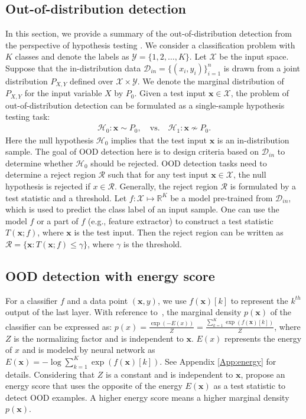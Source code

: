 \documentclass{article}
\newcommand{\benr}{\begin{eqnarray}}
\newcommand{\eenr}{\end{eqnarray}}
\newcommand{\cD}{\mathcal D}
\newcommand{\cH}{\mathcal H}
\newcommand{\cR}{\mathcal R}
\newcommand{\cX}{\mathcal X}
\newcommand{\cY}{\mathcal Y}
\def\rvx{{\mathbf{x}}}
\newcommand{\R}{\mathbb R}
\begin{document}
\subsection{Out-of-distribution detection}\label{testOOD}
In this section, we provide a summary of the out-of-distribution detection from the perspective of hypothesis testing \cite{nalisnick2019detecting,ahmadianlikelihood,haroush2021statistical,zhang2021understanding,bergamin2022model}.
We consider a classification problem with $K$ classes and denote the labels as $\cY = \{1,2,\ldots, K\}$.
Let $\cX$ be the input space. Suppose that the in-distribution data $\cD_{in}=\{(x_i, y_i)\}_{i=1}^n$ is drawn from a joint distribution $P_{X,Y}$ defined over $\cX \times \cY.$
We denote the marginal distribution of $P_{X,Y}$ for the input variable $X$ by $P_0.$ 
Given a test input $\rvx\in\cX$, the problem of out-of-distribution  detection can be formulated as a single-sample hypothesis testing task:
\benr \label{Eq:test}
\cH_0: \rvx \sim P_0, \quad \text{vs.} \quad \cH_1: \rvx \nsim P_0. 
\label{eq1}
\eenr
Here the null hypothesis $\cH_0$ implies that the test input $\rvx$ is an in-distribution sample.
The goal of OOD detection here is to design criteria based on $\cD_{in}$ to determine whether $\cH_0$ should be rejected. OOD detection tasks need to determine a reject region $\cR$ such that for any test input $\rvx \in \cX$, the null hypothesis is rejected if $x \in \cR.$
Generally, the reject region $\cR$ is formulated by a test statistic and a threshold.
Let $f: \cX \mapsto \R^K$ be a  model pre-trained from $\cD_{in}$, which is used to predict the class label of an input sample.   
One can use the model $f$ or a part of $f$ (e.g., feature extractor) to construct a test statistic $T(\rvx; f)$, where $\rvx$ is the test input. Then the reject region can be written as
$
\cR = \{\rvx: T(\rvx;f) \leq \gamma\}
$,
where $\gamma$ is the threshold.


\subsection{OOD detection with energy score}


For a classifier $f$ and a data point $(\rvx, y)$, we use $f(\rvx)[k]$ to represent the $k^{th}$ output of the last layer. With reference to~\cite{liu2020energy,grathwohl2019your,energyrobust}, the marginal density $p({\boldsymbol{x}})$ of the classifier can be expressed as: $p(x) = \frac{\exp(-E(x))}{Z} = \frac{\sum_{k=1}^{K} \exp({f(\rvx)[k]})}{Z}$, 
where $Z$ is the normalizing factor and is independent to $\rvx$. $E(x)$ represents the energy of $x$ and is modeled by neural network as $E(\rvx)=-\log \sum_{k=1}^{K} \exp({f(\rvx)[k]})$. See Appendix \ref{App:energy} for details.
Considering that $Z$ is a constant and is independent to $\rvx$, \citet{liu2020energy} propose an energy score that uses the opposite of the energy $E(\rvx)$ as a test statistic to detect OOD examples. A higher energy score means a higher marginal density $p({\boldsymbol{x}})$. 
\end{document}
